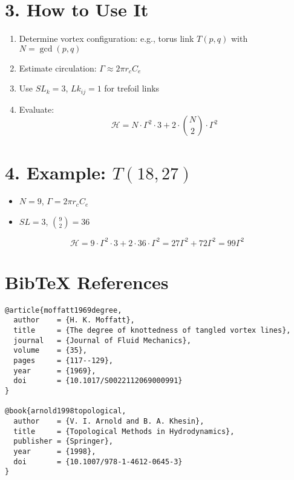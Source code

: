 \documentclass[12pt]{article}
\begin{document}
    \section*{3. How to Use It}
    \begin{enumerate}
        \item Determine vortex configuration: e.g., torus link $T(p,q)$ with $N = \gcd(p,q)$
        \item Estimate circulation: $\Gamma \approx 2\pi r_c C_e$
        \item Use $SL_k = 3$, $Lk_{ij} = 1$ for trefoil links
        \item Evaluate:
        \[ \mathcal{H} = N \cdot \Gamma^2 \cdot 3 + 2 \cdot \binom{N}{2} \cdot \Gamma^2 \]
    \end{enumerate}

    \section*{4. Example: $T(18,27)$}
    \begin{itemize}
        \item $N = 9$, $\Gamma = 2\pi r_c C_e$
        \item $SL = 3$, $\binom{9}{2} = 36$
    \end{itemize}
    \begin{equation}
        \mathcal{H} = 9 \cdot \Gamma^2 \cdot 3 + 2 \cdot 36 \cdot \Gamma^2 = 27\Gamma^2 + 72\Gamma^2 = 99\Gamma^2
    \end{equation}

    \section*{BibTeX References}
    \begin{verbatim}
@article{moffatt1969degree,
  author    = {H. K. Moffatt},
  title     = {The degree of knottedness of tangled vortex lines},
  journal   = {Journal of Fluid Mechanics},
  volume    = {35},
  pages     = {117--129},
  year      = {1969},
  doi       = {10.1017/S0022112069000991}
}

@book{arnold1998topological,
  author    = {V. I. Arnold and B. A. Khesin},
  title     = {Topological Methods in Hydrodynamics},
  publisher = {Springer},
  year      = {1998},
  doi       = {10.1007/978-1-4612-0645-3}
}
    \end{verbatim}
\end{document}
